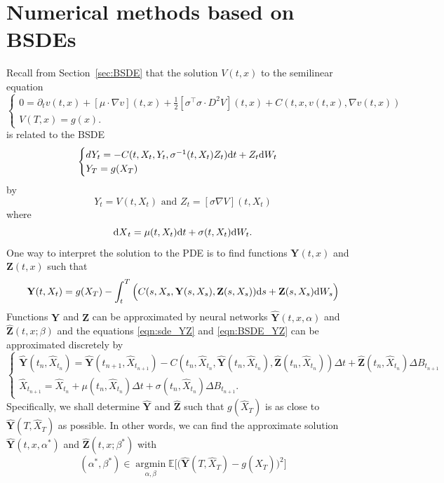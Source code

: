 \documentclass[11pt]{book}
\newcommand{\dt}{\text{\normalfont d}t}
\newcommand{\ds}{\text{\normalfont d}s}
\newcommand{\dX}{\text{\normalfont d}X}
\newcommand{\dW}{\text{\normalfont d}W}
\begin{document}
\section{Numerical methods based on BSDEs}
Recall from Section~\ref{sec:BSDE} that the solution $V(t,x)$ to the semilinear equation 
\begin{equation}
\begin{cases}
0=\partial_{t}v(t,x)+[\mu\cdot{\nabla}v](t,x)+\frac12[{\sigma^\intercal\sigma\cdot}D^2V](t,x)+C(t,x,v(t,x),\nabla v(t,x))\\
V(T,x)=g(x).
\end{cases}		
\end{equation}
is related to the BSDE
\begin{equation}
\begin{cases}
dY_t=- C(t,X_t,Y_t,\sigma^{-1}(t,X_t)Z_t){{\dt}}+Z_t\dW_t\\
Y_T=g(X_T)
\end{cases}
\end{equation}
by 
\begin{equation}
    Y_t=V(t,X_t) \textrm{ and } Z_t=[\sigma\nabla V](t,X_t)
\end{equation}
where 
\begin{equation}\label{eqn:sde_YZ}
{\dX}_t=\mu(t,X_t){{\dt}}+\sigma(t,X_t)\dW_t.
\end{equation}
One way to interpret the solution to the PDE is to find  functions $\mathbf{Y}(t,x)$ and $\mathbf{Z}(t,x)$ such that 
\begin{equation}\label{eqn:BSDE_YZ}
\mathbf{Y}(t,X_t)=g(X_T) -\int_t^T \Big(C(s,X_s,\mathbf{Y}(s,X_s),\mathbf{Z}(s,X_s)){{\ds}}+\mathbf{Z}(s,X_s)\dW_s\Big)
\end{equation}
Functions $\mathbf{Y}$ and $\mathbf{Z}$ can be approximated by neural networks $\hat{\mathbf{Y}}(t,x,\alpha)$ and $\hat{\mathbf{Z}}(t,x;\beta)$ and the equations \eqref{eqn:sde_YZ} and \eqref{eqn:BSDE_YZ} can be approximated discretely by 
\begin{equation}
\begin{cases}
\hat{\mathbf{Y}}(t_n,\hat{X}_{t_n})
=\hat{\mathbf{Y}} (t_{n+1},\hat{X}_{t_{n+1}}) 
- C(t_n,\hat{X}_{t_n},\hat{\mathbf{Y}}(t_n,\hat{X}_{t_n}),\hat{\mathbf{Z}}(t_n,\hat{X}_{t_n})) \Delta t
+\hat{\mathbf{Z}}(t_n,\hat{X}_{t_n})\Delta B_{t_{n+1}}\\
\hat{X}_{t_{n+1}}=\hat{X}_{t_n}+\mu(t_n,\hat{X}_{t_n})\Delta t+\sigma(t_n,\hat{X}_{t_n})\Delta B_{t_{n+1}}.
\end{cases}
\end{equation}
Specifically, we shall determine $\hat{\mathbf{Y}}$ and $\hat{\mathbf{Z}}$ such that $g(\hat{X}_T)$ is as close to $\hat{\mathbf{Y}}(T,\hat{X}_T)$ as possible. In other words,  we can find the approximate solution $\hat{\mathbf{Y}}(t,x,\alpha^*)$ and $\hat{\mathbf{Z}}(t,x;\beta^*)$ with 
\begin{equation}
    (\alpha^*,\beta^*)\in\mathop\textrm{argmin}\limits_{\alpha,\beta}\mathbb{E}\Big[\big(\hat{\mathbf{Y}}(T,\hat{X}_T)-g(\hat{X}_T)\big)^2\Big]
\end{equation}
\end{document}
